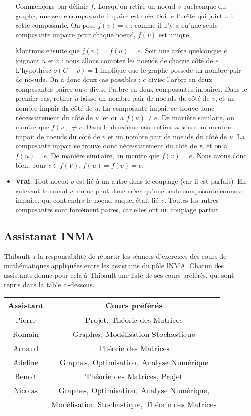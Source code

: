 \begin{solution}
\begin{itemize}
      	Commençons par définir $f$. Lorsqu'on retire un noeud $v$ quelconque du graphe, une seule composante impaire est crée. Soit $e$ l'arête qui joint $v$ à cette composante. On pose $f(v) = e$ ; comme il n'y a qu'une seule composante impaire pour chaque noeud, $f(v)$ est unique.
      	
      	Montrons ensuite que $f(v) = f(u) = e$. Soit une arête quelconque $e$ joignant $u$ et $v$ ; nous allons compter les noeuds de chaque côté de $e$. L'hypothèse $o(G-v) = 1$ implique que le graphe possède un nombre pair de noeuds. On a donc deux cas possibles : $e$ divise l'arbre en deux composantes paires ou $e$ divise l'arbre en deux composantes impaires. Dans le premier cas, retirer $u$ laisse un nombre pair de noeuds du côté de $v$, et un nombre impair du côté de $u$. La composante impair se trouve donc nécessairement du côté de $u$, et on a $f(u) \neq e$. De manière similaire, on montre que $f(v) \neq e$. Dans le deuxième cas, retirer $u$ laisse un nombre impair de noeuds du côté de $v$ et un nombre pair de noeuds du côté de $u$. La composante impair se trouve donc nécessairement du côté de $v$, et on a $f(u) = e$. De manière similaire, on montre que $f(v) = e$. Nous avons donc bien, pour $e \in f(V)$, $f(u) = f(v) = e$.
      	\item \textbf{Vrai}. Tout noeud $v$ est lié à un autre dans le couplage (car il est parfait). En enlevant le noeud $v$, on ne peut donc créer qu'une seule composante connexe impaire, qui contiendra le noeud auquel était lié $v$. Toutes les autres composantes sont forcément paires, car elles ont un couplage parfait.
	\end{itemize}
\end{solution}

\subsection{Assistanat INMA}
Thibault a la responsabilité de répartir les séances d'exercices des cours de mathématiques appliquées entre les assistants du pôle INMA. Chacun des assistants donne pour cela à Thibault une liste de ses cours préférés, qui sont repris dans la table ci-dessous.

\begin{center}
  \begin{tabular}{|c|c|}
    \hline
    Assistant & Cours préférés \\
    \hline
    Pierre & Projet, Théorie des Matrices \\
    Romain & Graphes, Modélisation Stochastique \\
    Arnaud & Théorie des Matrices \\
    Adeline & Graphes, Optimisation, Analyse Numérique \\
    Benoit & Théorie des Matrices, Projet \\
    Nicolas & Graphes, Optimisation, Analyse Numérique, \\
            & Modélisation Stochastique, Théorie des Matrices  \\
    \hline
  \end{tabular}
\end{center}

